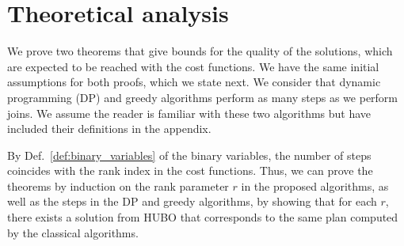 \section{Theoretical analysis}
We prove two theorems that give bounds for the quality of the solutions, which are expected to be reached with the cost functions. We have the same initial assumptions for both proofs, which we state next. We consider that dynamic programming (DP) and greedy algorithms perform as many steps as we perform joins. We assume the reader is familiar with these two algorithms but have included their definitions in the appendix. 

By Def.~\eqref{def:binary_variables} of the binary variables, the number of steps coincides with the rank index in the cost functions. Thus, we can prove the theorems by induction on the rank parameter $r$ in the proposed algorithms, as well as the steps in the DP and greedy algorithms, by showing that for each $r$, there exists a solution from HUBO that corresponds to the same plan computed by the classical algorithms.

